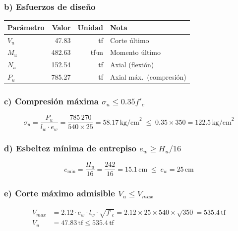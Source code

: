 \subsubsection*{b) Esfuerzos de diseño}
\begin{center}
\begin{tabular}{lrrl}\toprule
Parámetro & Valor & Unidad & Nota\\\midrule
$V_u$ & 47.83  & tf         & Corte último\\
$M_u$ & 482.63 & tf$\cdot$m & Momento último\\
$N_u$ & 152.54 & tf         & Axial (flexión)\\
$P_u$ & 785.27 & tf         & Axial máx.\ (compresión)\\\bottomrule
\end{tabular}
\end{center}

\subsubsection*{c) Compresión máxima $\sigma_u \leq 0.35f'_c$}
\begin{equation*}
\sigma_u = \frac{P_u}{l_w\cdot e_w}
         = \frac{785\,270}{540\times25}
         = 58.17\,\text{kg/cm}^2
\;\leq\; 0.35\times350 = 122.5\,\text{kg/cm}^2
\end{equation*}

\subsubsection*{d) Esbeltez mínima de entrepiso $e_w \geq H_u/16$}
\begin{equation*}
e_{\min}=\frac{H_u}{16}=\frac{242}{16}=15.1\,\text{cm}
\;\leq\; e_w=25\,\text{cm}
\end{equation*}

\subsubsection*{e) Corte máximo admisible $V_u \leq V_{max}$}
\begin{align*}
V_{max} &= 2.12\cdot e_w\cdot l_w\cdot\sqrt{f'_c}
         = 2.12\times25\times540\times\sqrt{350} = 535.4\,\text{tf}\\
V_u     &= 47.83\,\text{tf} \leq 535.4\,\text{tf}
\end{align*}

